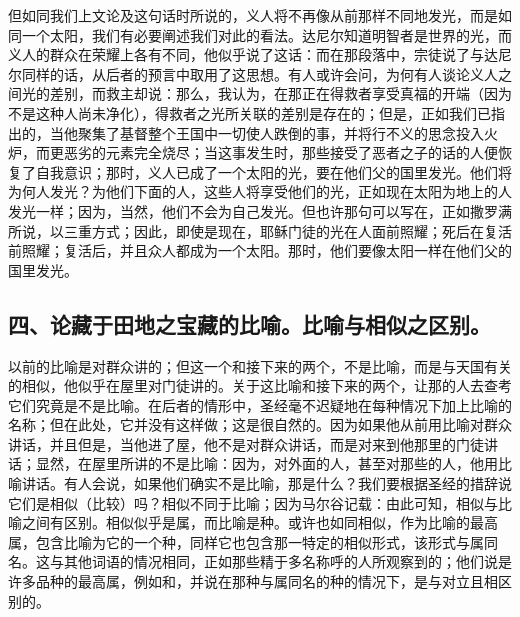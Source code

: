 但如同我们上文论及这句话时所说的，义人将不再像从前那样不同地发光，而是如同一个太阳，我们有必要阐述我们对此的看法。达尼尔知道明智者是世界的光，而义人的群众在荣耀上各有不同，他似乎说了这话：而在那段落中，宗徒说了与达尼尔同样的话，从后者的预言中取用了这思想。有人或许会问，为何有人谈论义人之间光的差别，而救主却说：那么，我认为，在那正在得救者享受真福的开端（因为不是这种人尚未净化），得救者之光所关联的差别是存在的；但是，正如我们已指出的，当他聚集了基督整个王国中一切使人跌倒的事，并将行不义的思念投入火炉，而更恶劣的元素完全烧尽；当这事发生时，那些接受了恶者之子的话的人便恢复了自我意识；那时，义人已成了一个太阳的光，要在他们父的国里发光。他们将为何人发光？为他们下面的人，这些人将享受他们的光，正如现在太阳为地上的人发光一样；因为，当然，他们不会为自己发光。但也许那句可以写在，正如撒罗满所说，以三重方式；因此，即使是现在，耶稣门徒的光在人面前照耀；死后在复活前照耀；复活后，并且众人都成为一个太阳。那时，他们要像太阳一样在他们父的国里发光。\par


\subsection{四、论藏于田地之宝藏的比喻。比喻与相似之区别。}

以前的比喻是对群众讲的；但这一个和接下来的两个，不是比喻，而是与天国有关的相似，他似乎在屋里对门徒讲的。关于这比喻和接下来的两个，让那的人去查考它们究竟是不是比喻。在后者的情形中，圣经毫不迟疑地在每种情况下加上比喻的名称；但在此处，它并没有这样做；这是很自然的。因为如果他从前用比喻对群众讲话，并且但是，当他进了屋，他不是对群众讲话，而是对来到他那里的门徒讲话；显然，在屋里所讲的不是比喻：因为，对外面的人，甚至对那些的人，他用比喻讲话。有人会说，如果他们确实不是比喻，那是什么？我们要根据圣经的措辞说它们是相似（比较）吗？相似不同于比喻；因为马尔谷记载：由此可知，相似与比喻之间有区别。相似似乎是属，而比喻是种。或许也如同相似，作为比喻的最高属，包含比喻为它的一个种，同样它也包含那一特定的相似形式，该形式与属同名。这与其他词语的情况相同，正如那些精于多名称呼的人所观察到的；他们说是许多品种的最高属，例如和，并说在那种与属同名的种的情况下，是与对立且相区别的。\par

